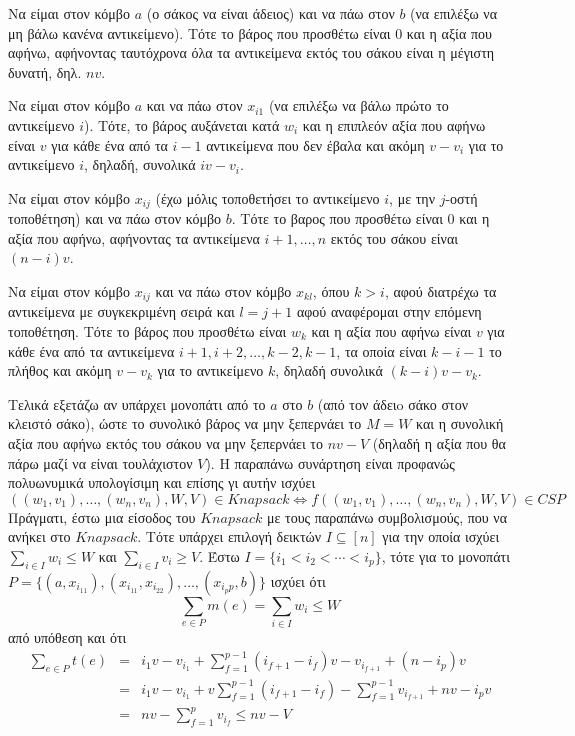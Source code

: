 \documentclass[12pt]{article}
\newenvironment{b_item}{
\begin{itemize}
  \setlength{\itemsep}{0pt}
  \setlength{\parskip}{0pt}
  \setlength{\parsep}{0pt}
}{\end{itemize}}
\begin{document}
\begin{b_item}
\item Να είμαι στον κόμβο $a$ (ο σάκος να είναι άδειος) και να πάω στον $b$ (να επιλέξω να μη βάλω κανένα αντικείμενο). Τότε το βάρος που προσθέτω είναι $0$ και η αξία που αφήνω, αφήνοντας ταυτόχρονα όλα τα αντικείμενα εκτός του σάκου είναι η μέγιστη δυνατή, δηλ. $nv$.
\item Να είμαι στον κόμβο $a$ και να πάω στον $x_{i1}$ (να επιλέξω να βάλω πρώτο το αντικείμενο $i$). Τότε, το βάρος αυξάνεται κατά $w_i$ και η επιπλεόν αξία που αφήνω είναι $v$ για κάθε ένα από τα $i-1$ αντικείμενα που δεν έβαλα και ακόμη $v-v_i$ για το αντικείμενο $i$, δηλαδή, συνολικά $iv-v_i$.
\item Να είμαι στον κόμβο $x_{ij}$ (έχω μόλις τοποθετήσει το αντικείμενο $i$, με την $j$-οστή τοποθέτηση) και να πάω στον κόμβο $b$. Τότε το βαρος που προσθέτω είναι $0$ και η αξία που αφήνω, αφήνοντας τα αντικείμενα $i+1,\ldots,n$ εκτός του σάκου είναι $(n-i)v$.
\item Να είμαι στον κόμβο $x_{ij}$ και να πάω στον κόμβο $x_{kl}$, όπου $k>i$, αφού διατρέχω τα αντικείμενα με συγκεκριμένη σειρά και $l=j+1$ αφού αναφέρομαι στην επόμενη τοποθέτηση. Τότε το βάρος που προσθέτω είναι $w_k$ και η αξία που αφήνω είναι $v$ για κάθε ένα από τα αντικείμενα $i+1,i+2,\ldots,k-2,k-1$, τα οποία είναι $k-i-1$ το πλήθος και ακόμη $v-v_k$ για το αντικείμενο $k$, δηλαδή συνολικά $(k-i)v-v_k$.
\end{b_item}
Τελικά εξετάζω αν υπάρχει μονοπάτι από το $a$ στο $b$ (από τον άδειo σάκο στον κλειστό σάκο), ώστε το συνολικό βάρος να μην ξεπερνάει το $M=W$ και η συνολική αξία που αφήνω εκτός του σάκου να μην ξεπερνάει το $nv-V$ (δηλαδή η αξία που θα πάρω μαζί να είναι τουλάχιστον $V$).
Η παραπάνω συνάρτηση είναι προφανώς πολυωνυμικά υπολογίσιμη και επίσης γι αυτήν ισχύει
$$((w_1,v_1),\ldots,(w_n,v_n),W,V)\in Knapsack\Leftrightarrow f((w_1,v_1),\ldots,(w_n,v_n),W,V)\in CSP$$
Πράγματι, έστω μια είσοδος του $Knapsack$ με τους παραπάνω συμβολισμούς, που να ανήκει στο $Knapsack$. Τότε υπάρχει επιλογή δεικτών $I\subseteq[n]$ για την οποία ισχύει $\sum_{i\in I}w_i\leq W$ και $\sum_{i\in I}v_i\geq V$. Έστω $I=\{i_1<i_2<\cdots<i_p\}$, τότε για το μονοπάτι $P=\{(a,x_{i_11}),(x_{i_11},x_{i_22}),\ldots,(x_{i_pp},b)\}$ ισχύει ότι
$$\sum_{e\in P}m(e)=\sum_{i\in I}w_i\leq W$$
από υπόθεση και ότι
$$\begin{array}{rcl}\sum_{e\in P}t(e)
&=&i_1v-v_{i_1}+\sum_{f=1}^{p-1}(i_{f+1}-i_f)v-v_{i_{f+1}}+(n-i_p)v\\
&=&i_1v-v_{i_1}+v\sum_{f=1}^{p-1}(i_{f+1}-i_f)-\sum_{f=1}^{p-1}v_{i_{f+1}}+nv-i_pv\\
&=&nv-\sum_{f=1}^pv_{i_f}\leq nv-V\\
\end{array}$$
\end{document}
